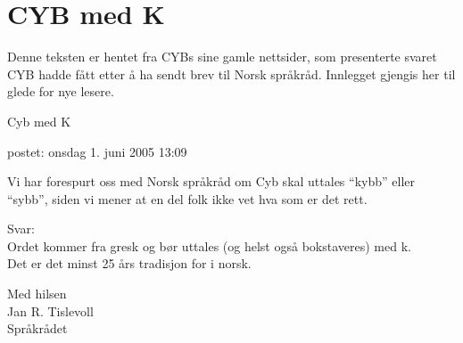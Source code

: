 \chapter{CYB med K}

Denne teksten er hentet fra CYBs sine gamle nettsider, som presenterte svaret CYB hadde fått etter å ha sendt brev til Norsk språkråd. Innlegget gjengis her til glede for nye lesere.

\begin{displayquote}
	Cyb med K

	postet: onsdag 1. juni 2005 13:09

	Vi har forespurt oss med Norsk språkråd om Cyb skal uttales ``kybb'' eller ``sybb'', siden vi mener at en del folk ikke vet hva som er det rett.

	Svar: \\
	Ordet kommer fra gresk og bør uttales (og helst også bokstaveres) med k. \\
	Det er det minst 25 års tradisjon for i norsk.

	Med hilsen \\
	Jan R. Tislevoll \\
	Språkrådet
\end{displayquote}
